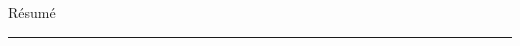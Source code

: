 \documentclass[10pt]{report}
\begin{document}
	
{\huge\hspace{210pt}R\'{e}sum\'{e}}
\\{\noindent\rule{18cm}{0.8pt}\\[4pt]}
\end{document}
